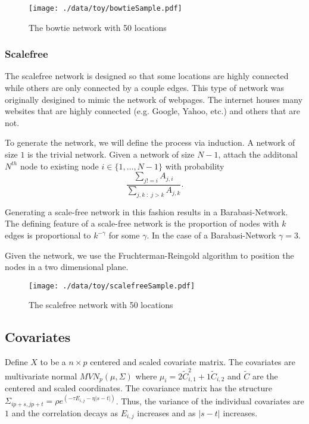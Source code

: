 \documentclass[11pt]{article}
\begin{document}
\begin{figure}[htb]
\centering
\texttt{[image: ./data/toy/bowtieSample.pdf]}
\caption{\label{fig:bowtie25}The bowtie network with 50 locations}
\end{figure}


\subsubsection{Scalefree}
\label{sec-2-1-6}

The scalefree network is designed so that some locations are highly
connected while others are only connected by a couple edges.  This
type of network was originally desigined to mimic the network of
webpages.  The internet houses many websites that are highly
connected (e.g. Google, Yahoo, etc.) and others that are not.

To generate the network, we will define the process via induction.  A
network of size $1$ is the trivial network.  Given a network of size
$N-1$, attach the additonal $N^{th}$ node to existing node $i \in
\lbrace 1,\ldots,N-1\rbrace$ with probability
\begin{equation*}
  \frac{\sum_{j!=i} A_{j,i}}{\sum_{j,k \;:\; j > k} A_{j,k}}.
\end{equation*}

Generating a scale-free network in this fashion results in a
Barabasi-Network.  The defining feature of a scale-free network is the
proportion of nodes with $k$ edges is proportional to $k^{-\gamma}$
for some $\gamma$.  In the case of a Barabasi-Network $\gamma = 3$.

Given the network, we use the Fruchterman-Reingold algorithm to
position the nodes in a two dimensional plane.


\begin{figure}[htb]
\centering
\texttt{[image: ./data/toy/scalefreeSample.pdf]}
\caption{\label{fig:scalefree25}The scalefree network with 50 locations}
\end{figure}




\subsection{Covariates}
\label{sec-2-2}

Define $X$ to be a $n \times p$ centered and scaled covariate matrix.
The covariates are multivariate normal $MVN_p(\mu,\Sigma)$ where
$\mu_i = 2\widetilde{C}_{i,1}^2 + 1\widetilde{C}_{i,2}$ and
$\widetilde{C}$ are the centered and scaled coordinates.  The
covariance matrix has the structure $\Sigma_{ip + s, jp + t} =
\rho e^{(-\tau  E_{i,j} - \eta |s-t|)}$.  Thus, the variance of the
individual covariates are $1$ and the correlation decays as $E_{i,j}$
increases and as $|s-t|$ increases.
\end{document}
